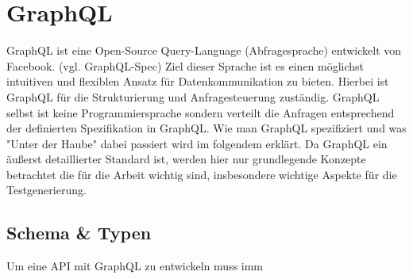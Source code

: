 \section{GraphQL}

GraphQL ist eine Open-Source Query-Language (Abfragesprache) entwickelt von Facebook. (vgl. GraphQL-Spec)
Ziel dieser Sprache ist es einen möglichst intuitiven und flexiblen Ansatz für Datenkommunikation zu bieten.
Hierbei ist GraphQL für die Strukturierung und Anfragesteuerung zuständig. GraphQL selbst ist keine Programmiersprache
sondern verteilt die Anfragen entsprechend der definierten Spezifikation in GraphQL.
Wie man GraphQL spezifiziert und was "Unter der Haube" dabei passiert wird im folgendem erklärt.
Da GraphQL ein äußerst detaillierter Standard ist, werden hier nur grundlegende Konzepte betrachtet die für die
Arbeit wichtig sind, insbesondere wichtige Aspekte für die Testgenerierung.

\subsection{Schema & Typen}

Um eine API mit GraphQL zu entwickeln muss imm






